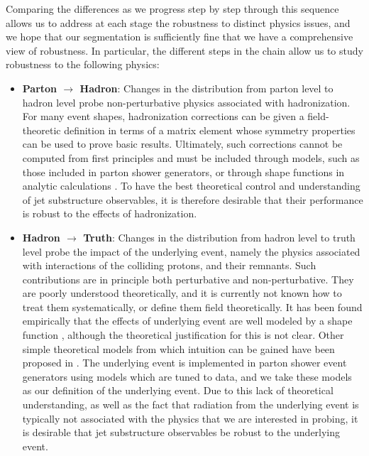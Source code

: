 \documentclass[11pt,letterpaper]{article}
\begin{document}
Comparing the differences as we progress step by step through this sequence allows us to address at each stage the robustness to distinct physics issues, and we hope that our segmentation is sufficiently fine that we have a comprehensive view of robustness.
%
In particular, the different steps in the chain allow us to study robustness to the following physics: 
%
\begin{itemize}
%
\item {\bf Parton $\to$ Hadron}: Changes in the distribution from parton
  level to hadron level probe non-perturbative physics associated with
  hadronization.
  For many event shapes, hadronization corrections can
  be given a field-theoretic definition in terms of a matrix element
  whose symmetry properties can be used to prove basic
  results.
  Ultimately, such corrections cannot be computed
  from first principles and must be included through models, such as
  those included in parton shower generators, or through shape
  functions in analytic calculations
  \cite{Dokshitzer:1995qm,Dokshitzer:1995zt,Korchemsky:1999kt,Korchemsky:2000kp,Bosch:2004th,Hoang:2007vb,Ligeti:2008ac}.
    To have the best theoretical
  control and understanding of jet substructure observables, it is
  therefore desirable that their performance is robust to the effects
  of hadronization.
\item {\bf Hadron $\to$ Truth}: Changes in the distribution from hadron level to truth level probe the impact of the underlying event, namely the physics associated with interactions of the colliding protons, and their remnants.
%
Such contributions are in principle both perturbative and non-perturbative.
%
They are poorly understood theoretically, and it is currently not known how to treat them systematically, or define them field theoretically.
%
It has been found empirically that the effects of underlying event are well modeled by a shape function \cite{Stewart:2014nna}, although the theoretical justification for this is not clear. Other simple theoretical models from which intuition can be gained have been proposed in \cite{Cacciari:2009dp}.
%
The underlying event is implemented in parton shower event generators using models which are tuned to data, and we take these models as our definition of the underlying event.
%
Due to this lack of theoretical understanding, as well as the fact that radiation from the underlying event is typically not associated with the physics that we are interested in probing, it is desirable that jet substructure observables be robust to the underlying event.

\end{itemize}
\end{document}
